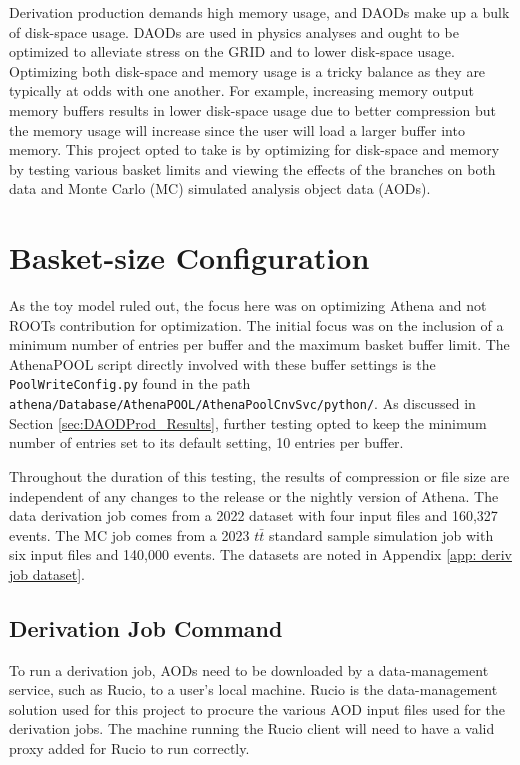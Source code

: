 Derivation production demands high memory usage, and DAODs make up a bulk of disk-space usage. 
DAODs are used in physics analyses and ought to be optimized to alleviate stress on the GRID and to lower disk-space usage. 
Optimizing both disk-space and memory usage is a tricky balance as they are typically at odds with one another. 
For example, increasing memory output memory buffers results in lower disk-space usage due to better compression but the memory usage will increase since the user will load a larger buffer into memory. 
This project opted to take is by optimizing for disk-space and memory by testing various basket limits and viewing the effects of the branches on both data and Monte Carlo (MC) simulated analysis object data (AODs).

\section{Basket-size Configuration}
\label{sec:DAODProd_Analysis}

As the toy model ruled out, the focus here was on optimizing Athena and not ROOTs contribution for optimization.
The initial focus was on the inclusion of a minimum number of entries per buffer and the maximum basket buffer limit.
The AthenaPOOL script directly involved with these buffer settings is the \verb|PoolWriteConfig.py| found in the path \verb|athena/Database/AthenaPOOL/AthenaPoolCnvSvc/python/|.
As discussed in Section \ref{sec:DAODProd_Results}, further testing opted to keep the minimum number of entries set to its default setting, 10 entries per buffer. 

Throughout the duration of this testing, the results of compression or file size are independent of any changes to the release or the nightly version of Athena.  
The data derivation job comes from a 2022 dataset with four input files and 160,327 events. 
The MC job comes from a 2023 $t\bar{t}$ standard sample simulation job with six input files and 140,000 events. 
The datasets are noted in Appendix \ref{app: deriv job dataset}.

\subsection{Derivation Job Command}
To run a derivation job, AODs need to be downloaded by a data-management service, such as Rucio, to a user's local machine.\cite{RUCIO_citation} 
Rucio is the data-management solution used for this project to procure the various AOD input files used for the derivation jobs.
The machine running the Rucio client will need to have a valid proxy added for Rucio to run correctly.  

